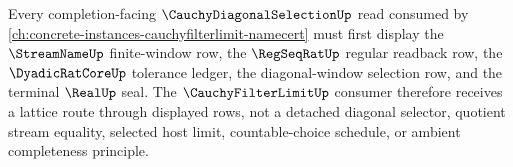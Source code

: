 Every completion-facing $\CauchyDiagonalSelectionUp$ read consumed by \autoref{ch:concrete-instances-cauchyfilterlimit-namecert} must first display the $\StreamNameUp$ finite-window row, the $\RegSeqRatUp$ regular readback row, the $\DyadicRatCoreUp$ tolerance ledger, the diagonal-window selection row, and the terminal $\RealUp$ seal. The $\CauchyFilterLimitUp$ consumer therefore receives a lattice route through displayed rows, not a detached diagonal selector, quotient stream equality, selected host limit, countable-choice schedule, or ambient completeness principle.
